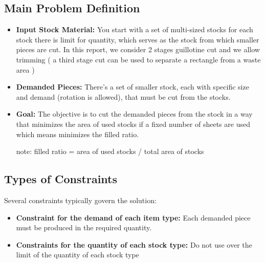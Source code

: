 \documentclass[a4paper]{article}
\begin{document}
\subsection{Main Problem Definition}
\begin{itemize}
    \item \textbf{Input Stock Material:} You start with a set of multi-sized stocks for each stock there is limit for quantity, which serves as the stock from which smaller pieces are cut. In this report, we consider 2 stages guillotine cut and we allow trimming ( a third stage cut can be used to separate a rectangle from a waste area ) 
    \item \textbf{Demanded Pieces:} There’s a set of smaller stock, each with specific size and demand (rotation is allowed), that must be cut from the stocks.
    \item \textbf{Goal: }The objective is to cut the demanded pieces from the stock in a way that minimizes the area of used stocks if a fixed number of sheets are used which means minimizes the filled ratio.

    
note: filled ratio = area of used stocks / total area of stocks
\end{itemize}



\subsection{Types of Constraints}
Several constraints typically govern the solution:
    \begin{itemize}
    
    \item \textbf{Constraint for the demand of each item type:} Each demanded piece must be produced in the required quantity.

    
    \item \textbf{Constraints for the quantity of each stock type:} Do not use over the limit of the quantity of each stock type 
\end{itemize}
\end{document}
